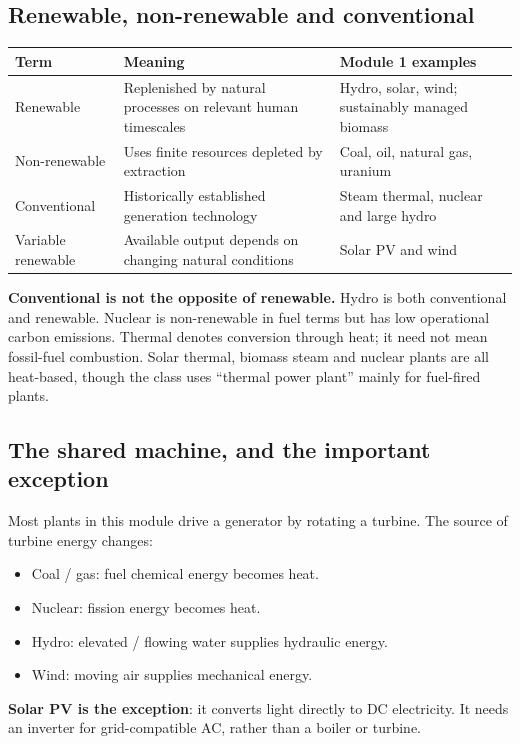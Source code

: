 \documentclass[11pt,a4paper]{article}
\begin{document}
\subsection{Renewable, non-renewable and conventional}
\begin{center}\small
\begin{tabularx}{\textwidth}{L{3cm}YY}
\toprule\textbf{Term} & \textbf{Meaning} & \textbf{Module 1 examples}\\\midrule
Renewable & Replenished by natural processes on relevant human timescales & Hydro, solar, wind; sustainably managed biomass\\
Non-renewable & Uses finite resources depleted by extraction & Coal, oil, natural gas, uranium\\
Conventional & Historically established generation technology & Steam thermal, nuclear and large hydro\\
Variable renewable & Available output depends on changing natural conditions & Solar PV and wind\\\bottomrule
\end{tabularx}\end{center}
\textbf{Conventional is not the opposite of renewable.} Hydro is both conventional and renewable. Nuclear is non-renewable in fuel terms but has low operational carbon emissions. Thermal denotes conversion through heat; it need not mean fossil-fuel combustion. Solar thermal, biomass steam and nuclear plants are all heat-based, though the class uses ``thermal power plant'' mainly for fuel-fired plants.

\subsection{The shared machine, and the important exception}
Most plants in this module drive a generator by rotating a turbine. The source of turbine energy changes:
\begin{itemize}
\item Coal / gas: fuel chemical energy becomes heat.
\item Nuclear: fission energy becomes heat.
\item Hydro: elevated / flowing water supplies hydraulic energy.
\item Wind: moving air supplies mechanical energy.
\end{itemize}
\textbf{Solar PV is the exception}: it converts light directly to DC electricity. It needs an inverter for grid-compatible AC, rather than a boiler or turbine.
\end{document}
